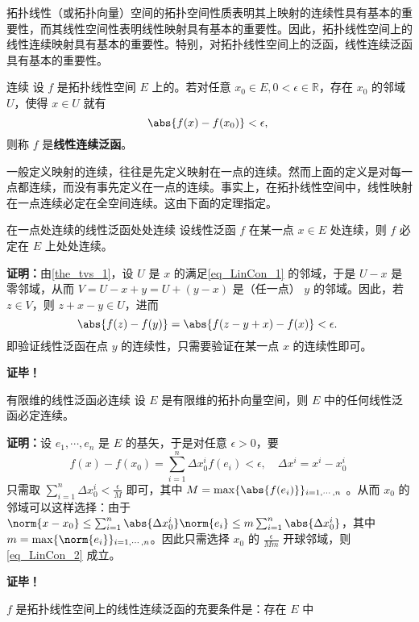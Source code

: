 
拓扑线性（或拓扑向量）空间的拓扑空间性质表明其上映射的连续性具有基本的重要性，而其线性空间性表明线性映射具有基本的重要性。因此，拓扑线性空间上的线性连续映射具有基本的重要性。特别，对拓扑线性空间上的泛函，线性连续泛函具有基本的重要性。
\begin{definition}{连续}
设 $f$ 是拓扑线性空间 $E$ 上的。若对任意 $x_0\in E,0<\epsilon\in\mathbb R$，存在 $x_0$ 的邻域 $U$，使得 $x\in U$ 就有
\begin{equation}\label{eq_LinCon_1}
\abs{f(x)-f(x_0)}<\epsilon,~
\end{equation}
则称 $f$ 是\textbf{线性连续泛函}。
\end{definition}

一般定义映射的连续，往往是先定义映射在一点的连续。然而上面的定义是对每一点都连续，而没有事先定义在一点的连续。事实上，在拓扑线性空间中，线性映射在一点连续必定在全空间连续。这由下面的定理指定。
\begin{theorem}{在一点处连续的线性泛函处处连续}
设线性泛函 $f$ 在某一点 $x\in E$ 处连续，则 $f$ 必定在 $E$ 上处处连续。
\end{theorem}
\textbf{证明：}由\autoref{the_tvs_1}，设 $U$ 是 $x$ 的满足\autoref{eq_LinCon_1} 的邻域，于是 $U-x$ 是零邻域，从而 $V=U-x+y=U+(y-x)$ 是（任一点） $y$ 的邻域。因此，若 $z\in V$，则 $z+x-y\in U$，进而
\begin{equation}
\abs{f(z)-f(y)}=\abs{f(z-y+x)-f(x)}<\epsilon.~
\end{equation}
即验证线性泛函在点 $y$ 的连续性，只需要验证在某一点 $x$ 的连续性即可。

\textbf{证毕！}

\begin{theorem}{有限维的线性泛函必连续}
设 $E$ 是有限维的拓扑向量空间，则 $E$ 中的任何线性泛函必定连续。
\end{theorem}
\textbf{证明：}设 $e_1,\cdots,e_n$ 是 $E$ 的基矢，于是对任意 $\epsilon>0$，要
\begin{equation}\label{eq_LinCon_2}
f(x)-f(x_0)=\sum_{i=1}^n\Delta x_0^i f(e_i)<\epsilon,\quad\Delta x^i=x^i-x^i_0~
\end{equation}
 只需取 $\sum_{i=1}^n\Delta x_0^i<\frac{\epsilon}{M}$ 即可，其中 $M=\max\{\abs{f(e_i)}\}_{i=1,\cdots,n}$ 。从而 $x_0$ 的邻域可以这样选择：由于 $\norm{x-x_0}\leq\sum_{i=1}^n\abs{\Delta x_0^i}\norm{e_i}\leq m\sum_{i=1}^n\abs{\Delta x_0^i}$，其中 $m=\max\{\norm{e_i}\}_{i=1,\cdots,n}$。因此只需选择 $x_0$ 的 $\frac{\epsilon}{Mm}$ 开球邻域，则\autoref{eq_LinCon_2} 成立。

\textbf{证毕！}

\begin{theorem}{}
 $f$ 是拓扑线性空间上的线性连续泛函的充要条件是：存在 $E$ 中
\end{theorem}




